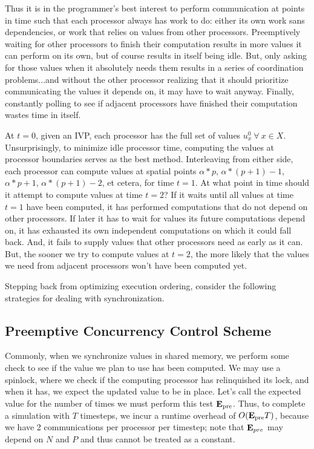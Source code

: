 Thus it is in the programmer's best interest to perform communication at points
in time such that each processor always has work to do: either its own work sans
dependencies, or work that relies on values from other processors. Preemptively
waiting for other processors to finish their computation results in more values
it can perform on its own, but of course results in itself being idle. But, only
asking for those values when it absolutely needs them results in a series of
coordination problems...and without the other processor realizing that it should
prioritize communicating the values it depends on, it may have to wait anyway.
Finally, constantly polling to see if adjacent processors have finished their
computation wastes time in itself.

At $t=0$, given an IVP, each processor has the full set of values $u^{0}_{x}
~ \forall ~ x \in X$. Unsurprisingly, to minimize idle processor time, computing
the values at processor boundaries serves as the best method. Interleaving from
either side, each processor can compute values at spatial points $\alpha*p$,
$\alpha*(p+1) - 1$, $\alpha*p + 1$, $\alpha*(p+1) - 2$, et cetera, for time $t =
1$. At what point in time should it attempt to compute values at time $t = 2$?
If it waits until all values at time $t = 1$ have been computed, it has
performed computations that do not depend on other processors. If later it has
to wait for values its future computations depend on, it has exhausted its own
independent computations on which it could fall back. And, it fails to supply
values that other processors need as early as it can. But, the sooner we try to
compute values at $t = 2$, the more likely that the values we need from adjacent
processors won't have been computed yet.

Stepping back from optimizing execution ordering, consider the following
strategies for dealing with synchronization.

\subsection{Preemptive Concurrency Control Scheme}
Commonly, when we synchronize values in shared memory, we perform some check to
see if the value we plan to use has been computed. We may use a spinlock, where
we check if the computing processor has relinquished its lock, and when it has,
we expect the updated value to be in place. Let's call the expected value for
the number of times we must perform this test $\mathbf{E}_\text{pre}$. Thus, to
complete a simulation with $T$ timesteps, we incur a runtime overhead of
$O(\mathbf{E}_\text{pre} T)$, because we have 2 communications per processor per
timestep; note that $\mathbf{E}_{pre}$ may depend on $N$ and $P$ and thus cannot be treated
as a constant.

